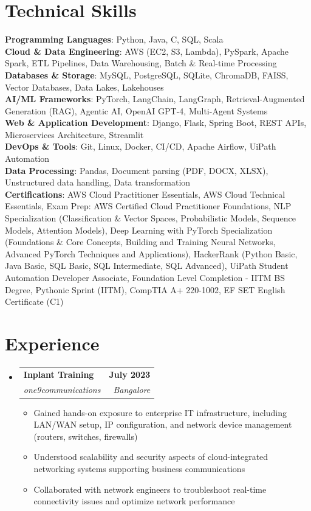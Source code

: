 \documentclass[letterpaper,11pt]{article}
\makeatletter
\newcommand{\resumeItem}[1]{
  \item\small{
    {#1 \vspace{-2pt}}
  }
}
\newcommand{\resumeSubheading}[4]{
  \vspace{-2pt}\item
    \begin{tabular*}{1.0\textwidth}[t]{l@{\extracolsep{\fill}}r}
      \textbf{#1} & \textbf{\small #2} \\
      \textit{\small#3} & \textit{\small #4} \\
    \end{tabular*}\vspace{-7pt}
}
\newcommand{\resumeSubHeadingListStart}{\begin{itemize}[leftmargin=0.0in, label={}]}
\newcommand{\resumeSubHeadingListEnd}{\end{itemize}}
\newcommand{\resumeItemListStart}{\begin{itemize}}
\newcommand{\resumeItemListEnd}{\end{itemize}\vspace{-5pt}}
\makeatother
\begin{document}
\section{Technical Skills}
 \begin{itemize}[leftmargin=0.15in, label={}]
    \small{\item{
     \textbf{Programming Languages}{: Python, Java, C, SQL, Scala} \\
     \textbf{Cloud \& Data Engineering}{: AWS (EC2, S3, Lambda), PySpark, Apache Spark, ETL Pipelines, Data Warehousing, Batch \& Real-time Processing} \\
     \textbf{Databases \& Storage}{: MySQL, PostgreSQL, SQLite, ChromaDB, FAISS, Vector Databases, Data Lakes, Lakehouses} \\
     \textbf{AI/ML Frameworks}{: PyTorch, LangChain, LangGraph, Retrieval-Augmented Generation (RAG), Agentic AI, OpenAI GPT-4, Multi-Agent Systems} \\
     \textbf{Web \& Application Development}{: Django, Flask, Spring Boot, REST APIs, Microservices Architecture, Streamlit} \\
     \textbf{DevOps \& Tools}{: Git, Linux, Docker, CI/CD, Apache Airflow, UiPath Automation} \\
     \textbf{Data Processing}{: Pandas, Document parsing (PDF, DOCX, XLSX), Unstructured data handling, Data transformation} \\
    \textbf{Certifications}{: AWS Cloud Practitioner Essentials, AWS Cloud Technical Essentials, Exam Prep: AWS Certified Cloud Practitioner Foundations, NLP Specialization (Classification \& Vector Spaces, Probabilistic Models, Sequence Models, Attention Models), Deep Learning with PyTorch Specialization (Foundations \& Core Concepts, Building and Training Neural Networks, Advanced PyTorch Techniques and Applications), HackerRank (Python Basic, Java Basic, SQL Basic, SQL Intermediate, SQL Advanced), UiPath Student Automation Developer Associate, Foundation Level Completion - IITM BS Degree, Pythonic Sprint (IITM), CompTIA A+ 220-1002, EF SET English Certificate (C1)} \\
    }}
 \end{itemize}
 \vspace{-16pt}

\section{Experience}
  \resumeSubHeadingListStart
    \resumeSubheading
      {Inplant Training}{July 2023}
      {one9communications}{Bangalore}
      \resumeItemListStart
        \resumeItem{Gained hands-on exposure to enterprise IT infrastructure, including LAN/WAN setup, IP configuration, and network device management (routers, switches, firewalls)}
        \resumeItem{Understood scalability and security aspects of cloud-integrated networking systems supporting business communications}
        \resumeItem{Collaborated with network engineers to troubleshoot real-time connectivity issues and optimize network performance}
      \resumeItemListEnd
  \resumeSubHeadingListEnd
\vspace{-16pt}
\end{document}
